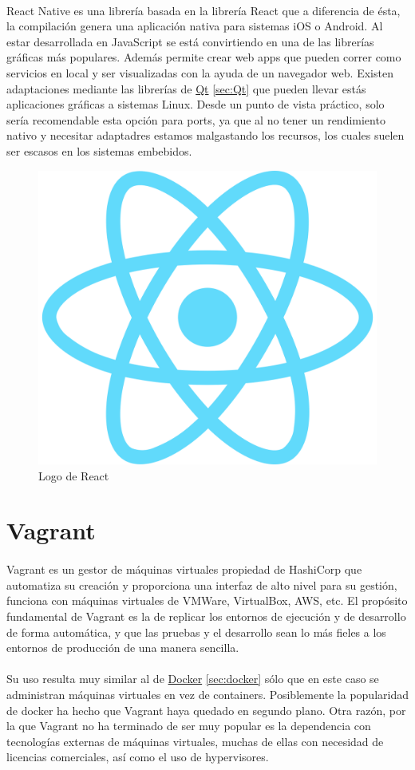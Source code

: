 \paragraph{}React Native es una librería basada en la librería React que a diferencia
de ésta, la compilación genera una aplicación nativa para sistemas iOS o Android. Al
estar desarrollada en JavaScript se está convirtiendo en una de las librerías gráficas
más populares. Además permite crear web apps que pueden correr como servicios en local
y ser visualizadas con la ayuda de un navegador web. Existen adaptaciones mediante las
librerías de \hyperref[sec:Qt]{Qt} \ref{sec:Qt} que pueden llevar estás aplicaciones
gráficas a sistemas Linux. Desde un punto de vista práctico, solo sería recomendable
esta opción para \gls{ports}, ya que al no tener un rendimiento nativo y necesitar
adaptadres estamos malgastando los recursos, los cuales suelen ser escasos en los sistemas
embebidos.

\begin{figure}[H]
	\centering
	\includegraphics[width=0.30\linewidth]{imgs/react-logo}
	\caption[React Logo]{Logo de React}
	\label{fig:react}
\end{figure}

\section{Vagrant}\label{sec:vagrant}

\paragraph{}Vagrant es un gestor de máquinas virtuales propiedad de HashiCorp que automatiza
su creación y proporciona una interfaz de alto nivel para su gestión, funciona con máquinas
virtuales de VMWare, VirtualBox, AWS, etc. El propósito fundamental de Vagrant es la de
replicar los entornos de ejecución y de desarrollo de forma automática, y que las pruebas
y el desarrollo sean lo más fieles a los entornos de producción de una manera sencilla.

\paragraph{}Su uso resulta muy similar al de \hyperref[sec:docker]{Docker} \ref{sec:docker}
sólo que en este caso se administran máquinas virtuales en vez de containers. Posiblemente
la popularidad de docker ha hecho que Vagrant haya quedado en segundo plano. Otra razón,
por la que Vagrant no ha terminado de ser muy popular es la dependencia con tecnologías
externas de máquinas virtuales, muchas de ellas con necesidad de licencias comerciales,
así como el uso de hypervisores.

